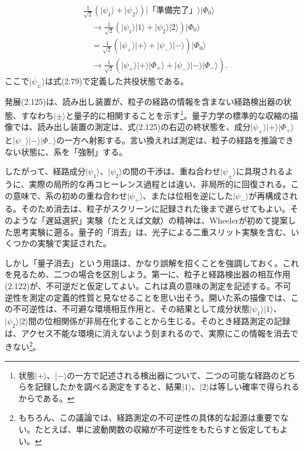 \hypertarget{srcpage:100}{}\label{srcpage:100}
\begin{equation}\begin{split}
&\frac1{\sqrt2}(\lvert\psi_1\rangle+\lvert\psi_2\rangle)\lvert\text{「準備完了」}\rangle\lvert\Phi_0\rangle\\
&\quad\longrightarrow\frac1{\sqrt2}(\lvert\psi_1\rangle\lvert1\rangle+\lvert\psi_2\rangle\lvert2\rangle)\lvert\Phi_0\rangle\\
&\quad=\frac1{\sqrt2}(\lvert\psi_+\rangle\lvert+\rangle+\lvert\psi_-\rangle\lvert-\rangle)\lvert\Phi_0\rangle\\
&\quad\longrightarrow\frac1{\sqrt2}(\lvert\psi_+\rangle\lvert+\rangle\lvert\Phi_+\rangle+\lvert\psi_-\rangle\lvert-\rangle\lvert\Phi_-\rangle).
\end{split}\tag{2.125}\end{equation}
ここで$\lvert\psi_\pm\rangle$は式(2.79)で定義した共役状態である。

発展(2.125)は、読み出し装置が、粒子の経路の情報を含まない経路検出器の状態、すなわち$\lvert\pm\rangle$と量子的に相関することを示す\footnote{状態$\lvert+\rangle$、$\lvert-\rangle$の一方で記述される検出器について、二つの可能な経路のどちらを記録したかを調べる測定をすると、結果$\lvert1\rangle$、$\lvert2\rangle$は等しい確率で得られるからである。}。量子力学の標準的な収縮の描像では、読み出し装置の測定は、式(2.125)の右辺の終状態を、成分$\lvert\psi_+\rangle\lvert+\rangle\lvert\Phi_+\rangle$と$\lvert\psi_-\rangle\lvert-\rangle\lvert\Phi_-\rangle$の一方へ射影する。言い換えれば測定は、粒子の経路を推論できない状態に、系を「強制」する。

したがって、経路成分$\lvert\psi_1\rangle$、$\lvert\psi_2\rangle$の間の干渉は、重ね合わせ$\lvert\psi_\pm\rangle$に具現されるように、実際の局所的な再コヒーレンス過程とは違い、非局所的に回復される。この意味で、系の初めの重ね合わせ$\lvert\psi_+\rangle$、または位相を逆にした$\lvert\psi_-\rangle$が再構成される。そのため消去は、粒子がスクリーンに記録された後まで遅らせてもよい。そのような「遅延選択」実験（たとえば文献\cite{ref131}）の精神は、Wheelerが初めて提案した思考実験\cite{ref041}に遡る。量子的「消去」は、光子による二重スリット実験\cite{ref135}を含む、いくつかの実験\cite{ref131,ref132,ref133,ref134,ref135}で実証された。

しかし「量子消去」という用語は、かなり誤解を招くことを強調しておく。これを見るため、二つの場合を区別しよう。第一に、粒子と経路検出器の相互作用(2.122)が、不可逆だと仮定してよい。これは真の意味の測定を記述する。不可逆性を測定の定義的性質と見なせることを思い出そう。開いた系の描像では、この不可逆性は、不可避な環境相互作用と、その結果として成分状態$\lvert\psi_1\rangle\lvert1\rangle$、$\lvert\psi_2\rangle\lvert2\rangle$間の位相関係が非局在化することから生じる。そのとき経路測定の記録は、アクセス不能な環境に消えないよう刻まれるので、実際にこの情報を消去できない\footnote{もちろん、この議論では、経路測定の不可逆性の具体的な起源は重要でない。たとえば、単に波動関数の収縮が不可逆性をもたらすと仮定してもよい。}。

